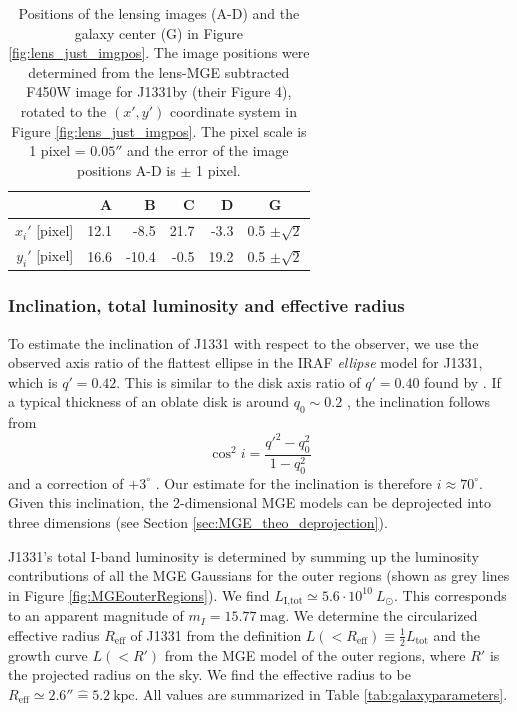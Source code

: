 \documentclass[useAMS,usenatbib]{mnras}
\begin{document}
\begin{table}
\centering
\caption{Positions of the lensing images (A-D) and the galaxy center (G) in Figure \ref{fig:lens_just_imgpos}. The image positions were determined from the lens-MGE subtracted F450W image for J1331by \citet{SWELLSIII} (their Figure 4), rotated to the $(x',y')$ coordinate system in Figure \ref{fig:lens_just_imgpos}. The pixel scale is 1 pixel = $0.05''$ and the error of the image positions A-D is $\pm$ 1 pixel.}
\begin{tabular}{r|rrrr|c}
\hline
  & A & B & C & D & G\\\hline
$x_i'$ [pixel] & 12.1 & -8.5 & 21.7 & -3.3 & 0.5 $\pm \sqrt{2}$ \\
$y_i'$ [pixel] & 16.6 & -10.4 & -0.5 & 19.2 & 0.5 $\pm \sqrt{2}$ \\
\hline
\end{tabular}
\label{tab:lenspos}
\end{table}

\subsubsection{Inclination, total luminosity and effective radius}

To estimate the inclination of J1331 with respect to the observer, we use the observed axis ratio of the flattest ellipse in the IRAF \emph{ellipse} model for J1331, which is $q'=0.42$. This is similar to the disk axis ratio of $q' = 0.40$ found by \citet{SWELLSI}. If a typical thickness of an oblate disk is around $q_0 \sim 0.2$ \citep{1958MeLu2.136....1H}, the inclination follows from 
\begin{equation}
\cos^2 i = \frac{q'^2 - q_0^2}{1 - q_0^2}
\end{equation}
and a correction of $+3^\circ$ \citep{1988ngc..book.....T}. Our estimate for the inclination is therefore $i \approx 70^\circ$. Given this inclination, the 2-dimensional MGE models can be deprojected into three dimensions (see Section \ref{sec:MGE_theo_deprojection}).

J1331's total I-band luminosity is determined by summing up the luminosity contributions of all the MGE Gaussians for the outer regions (shown as grey lines in Figure \ref{fig:MGEouterRegions}). We find $L_\text{I,tot} \simeq 5.6 \cdot 10^{10} ~L_\odot$. This corresponds to an apparent magnitude of $m_I = 15.77~\text{mag}$. We determine the circularized effective radius $R_\text{eff}$ of J1331 from the definition $L(<R_\text{eff}) \equiv \frac 12 L_\text{tot}$ and the growth curve $L(<R')$ from the MGE model of the outer regions, where $R'$ is the projected radius on the sky. We find the effective radius to be $R_\text{eff} \simeq 2.6'' \hat{=} 5.2~\text{kpc}$.  All values are summarized in Table \ref{tab:galaxyparameters}.
\end{document}
